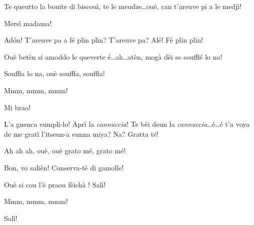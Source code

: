 \begin{drama}

\Gerominespeaks{} Te queutto la bouite di biscouì, te le meudze\ldots ouè, can t'areuve pi a le medjì!


\Eunfeurmispeaks Mersì madama!

\Casimirspeaks{} Ad\'on! T'areuve pa a fé plin plin?  T'areuve pa? Alé! Fé plin plin!

\Gerominespeaks{} Ouè betèn si amoddo le queverte é\ldots ah\ldots atèn, mogà dèi se soufflé lo na!


\Gerominespeaks Souffla lo na, ouè souffla, souffla!


\PersEmpourtantaspeaks Mmm, mmm, mmm! 

\Gerominespeaks Mi brao!

\Casimirspeaks L'a gnenca eumpli-lo! Aprì la \textit{cannuccia}! Te bèi deun la \textit{cannuccia}\ldots é\ldots é t'a voya de me gratì l'itseun-a eunna miya? Na? Gratta té!

\Gerominespeaks{} Ah ah ah, ouè, ouè grato mé, grato mé!

\Casimirspeaks Bon, vo salièn! Conserva-té di gamolle!

\Gerominespeaks Ouè si cou l'è praou fèichà \bendato! Salì!

\PersEmpourtantaspeaks{} Mmm, mmm, mmm! 

\Eunfeurmispeaks Salì!


\ridocliou

\DeriLeRido


\end{drama}
